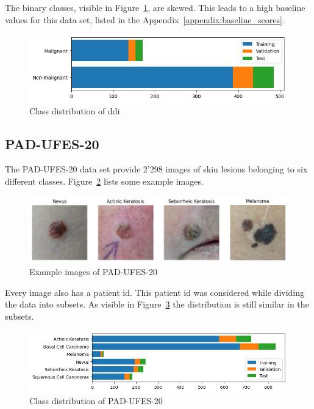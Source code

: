 The binary classes, visible in Figure~\ref{fig:class_distribution_of_ddi}, are skewed. This leads to a high baseline values for this data set, listed in the Appendix~\ref{appendix:baseline_scores}.

\begin{figure}[H]
    \begin{center}
    \includegraphics[width=15cm]{../../images/class_distribution_of_ddi.png}
    \caption{Class distribution of \gls{ddi}}\label{fig:class_distribution_of_ddi}
    \end{center}
\end{figure}


\subsection{PAD-UFES-20}
The PAD-UFES-20 data set provide 2'298 images of skin lesions belonging to six different classes. 
Figure~\ref{fig:example_images_of_pad-ufes-20} lists some example images.

\begin{figure}[H]
    \begin{center}
    \includegraphics[width=15cm]{../../images/example_images_of_pad-ufes-20.png}
    \caption{Example images of PAD-UFES-20}\label{fig:example_images_of_pad-ufes-20}
    \end{center}
\end{figure}

Every image also has a patient id. This patient id was considered while dividing the data into subsets. As visible in Figure~\ref{fig:class_distribution_of_pad-ufes-20} the distribution is still similar in the subsets. 

\begin{figure}[H]
    \begin{center}
    \includegraphics[width=15cm]{../../images/class_distribution_of_pad-ufes-20.png}
    \caption{Class distribution of PAD-UFES-20}\label{fig:class_distribution_of_pad-ufes-20}
    \end{center}
\end{figure}


